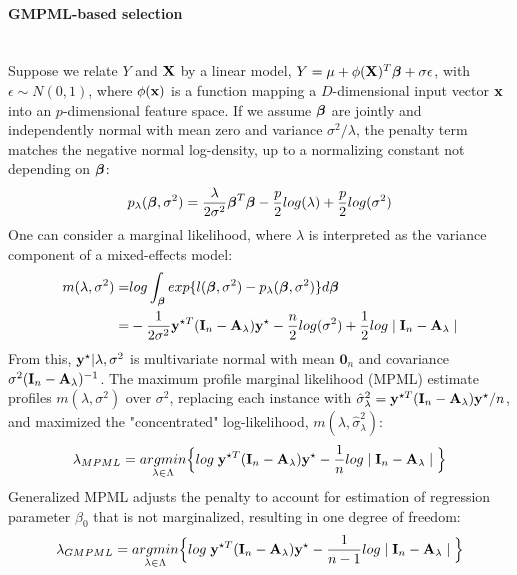 \documentclass[11pt]{article}
\begin{document}
\paragraph{GMPML-based selection}\mbox{}\\
Suppose we relate $Y$ and ${\bf X}$ by a linear model, $Y=\mu+\phi({\bf X})^T\boldsymbol{\beta}+\sigma \epsilon$, with $\epsilon \sim N(0, 1)$, where $\phi({\bf x})$ is a function mapping a $D$-dimensional input vector ${\bf x}$ into an $p$-dimensional feature space. If we assume $\boldsymbol{\beta}$ are jointly and independently normal with mean zero and variance $\sigma^2/\lambda$, the penalty term matches the negative normal log-density, up to a normalizing constant not depending on $\boldsymbol{\beta}$:
\begin{align*}
p_\lambda(\boldsymbol{\beta}, \sigma^2)=\frac{\lambda}{2\sigma^2}\boldsymbol{\beta}^T\boldsymbol{\beta}-\frac{p}{2}log(\lambda)+\frac{p}{2}log(\sigma^2)
\end{align*}
One can consider a marginal likelihood, where $\lambda$ is interpreted as the variance component of a mixed-effects model:
\begin{align*}
m(\lambda, \sigma^2)=&log \int_{\boldsymbol{\beta}} exp\{ l(\boldsymbol{\beta}, \sigma^2)-p_\lambda(\boldsymbol{\beta}, \sigma^2)\}d\boldsymbol{\beta} \\=&-\frac{1}{2\sigma^2}{\bf y}^{\star T}({\bf I}_n-{\bf A}_\lambda){\bf y}^\star-\frac{n}{2}log(\sigma^2)+\frac{1}{2}log \mid {\bf I}_n-{\bf A}_\lambda \mid
\end{align*}
From this, ${\bf y}^\star |\lambda, \sigma^2$ is multivariate normal with mean $\mathbf{0}_n$ and covariance $\sigma^2({\bf I}_n-{\bf A}_\lambda)^{-1}$. The maximum profile marginal likelihood (MPML) estimate profiles $m(\lambda, \sigma^2)$ over $\sigma^2$, replacing each instance with $\hat{\sigma}_\lambda^2={\bf y}^{\star T}({\bf I}_n-{\bf A}_\lambda){\bf y}^\star/n$, and maximized the "concentrated" log-likelihood, $m(\lambda, \hat{\sigma}_\lambda^2)$:
\begin{align*}
\lambda_{MPML}=\underset{\lambda \in \Lambda}{argmin}\Big\{log\; {\bf y}^{\star T}({\bf I}_n-{\bf A}_\lambda){\bf y}^\star-\frac{1}{n}log \mid {\bf I}_n-{\bf A}_\lambda \mid \Big\}
\end{align*}
Generalized MPML adjusts the penalty to account for estimation of regression parameter $\beta_0$ that is not marginalized, resulting in one degree of freedom:
\begin{align}
\lambda_{GMPML}=\underset{\lambda \in \Lambda}{argmin}\Big\{log\; {\bf y}^{\star T}({\bf I}_n-{\bf A}_\lambda){\bf y}^\star-\frac{1}{n-1}log \mid {\bf I}_n-{\bf A}_\lambda \mid \Big\}
\end{align}
\end{document}
